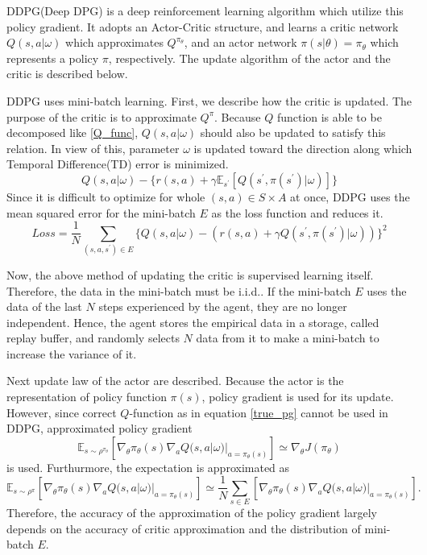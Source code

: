 \documentclass[english, dvipdfmx]{ampmt}             %
\newcommand{\expect}{\mathbb{E}}
\begin{document}
DDPG(Deep DPG) is a deep reinforcement learning algorithm which utilize this policy gradient. It adopts an Actor-Critic structure, and learns a critic network $Q(s,a|\omega)$ which approximates $Q^{\pi_{\theta}}$, and an actor network $\pi(s|\theta)=\pi_{\theta}$ which represents a policy $\pi$, respectively. The update algorithm of the actor and the critic is described below.\par
DDPG uses mini-batch learning. First, we describe how the critic is updated. The purpose of the critic is to approximate $Q^{\pi}$. Because $Q$ function is able to be decomposed like \eqref{Q_func}, $Q(s,a|\omega)$ should also be updated to satisfy this relation. In view of this, parameter $\omega$ is updated toward the direction along which Temporal Difference(TD) error is minimized.
\begin{equation}
	Q(s,a|\omega) - \{r(s,a)+\gamma \expect_{s^{\prime}}[Q(s^{\prime},\pi(s^{\prime})|\omega)]\}
\end{equation}
Since it is difficult to optimize for whole $(s,a) \in S\times A$ at once, DDPG uses the mean squared error for the mini-batch $E$ as the loss function and reduces it. 
\begin{equation}
	Loss = \frac{1}{N}\sum_{(s,a,s^{\prime})\in E} \{Q(s,a|\omega) - (r(s,a)+\gamma Q(s^{\prime},\pi(s^{\prime})|\omega))\}^2
\end{equation}\par
Now, the above method of updating the critic is supervised learning itself. Therefore, the data in the mini-batch must be i.i.d.. If the mini-batch $E$ uses the data of the last $N$ steps experienced by the agent, they are no longer independent. Hence, the agent stores the empirical data in a storage, called replay buffer, and randomly selects $N$ data from it to make a mini-batch to increase the variance of it.\par
Next update law of the actor are described. Because the actor is the representation of policy function $\pi(s)$, policy gradient is used for its update. However, since correct $Q$-function as in equation \eqref{true_pg} cannot be used in DDPG, approximated policy gradient
\begin{equation}
	\expect_{s\sim\rho^{\pi_{\theta}}}[\nabla_{\theta}\pi_{\theta}(s)\nabla_{a}Q(s, a|\omega)|_{a=\pi_{\theta}(s)}] \simeq \nabla_{\theta}J(\pi_{\theta}) 
\end{equation}
 is used. Furthurmore, the expectation is approximated as
 \begin{equation}
	\expect_{s\sim\rho^{\pi}}[\nabla_{\theta}\pi_{\theta}(s)\nabla_{a}Q(s, a|\omega)|_{a=\pi_{\theta}(s)}] \simeq \frac{1}{N}\sum_{s\in E}[\nabla_{\theta}\pi_{\theta}(s)\nabla_{a}Q(s, a|\omega)|_{a=\pi_{\theta}(s)}]. \label{expectation_approximation}
\end{equation}
Therefore, the accuracy of the approximation of the policy gradient largely depends on the accuracy of critic approximation and the distribution of mini-batch $E$.
\end{document}

